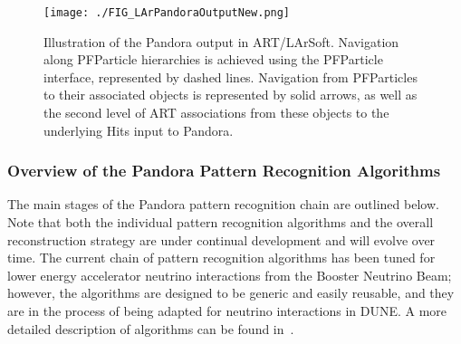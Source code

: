 \begin{figure}[!h!tbp]
\centering
\texttt{[image: ./FIG\_LArPandoraOutputNew.png]}
\caption{Illustration of the Pandora output in ART/LArSoft. Navigation along PFParticle hierarchies is achieved using the PFParticle interface, represented by dashed lines. Navigation from PFParticles to their associated objects is represented by solid arrows, as well as the second level of ART associations from these objects to the underlying Hits input to Pandora.}
\label{larsoft_output}
\end{figure}

\subsubsection{Overview of the Pandora Pattern Recognition Algorithms}

The main stages of the Pandora pattern recognition chain are outlined below. Note that both the individual pattern recognition algorithms and the overall reconstruction strategy are under continual development and will evolve over time. The current chain of pattern recognition algorithms has been tuned for lower energy accelerator neutrino interactions from the Booster Neutrino Beam; however, the algorithms are designed to be generic and easily reusable, and they are in the process of being adapted for neutrino interactions in DUNE. A more detailed description of algorithms can be found in~\cite{Acciarri:2017hat}. 


